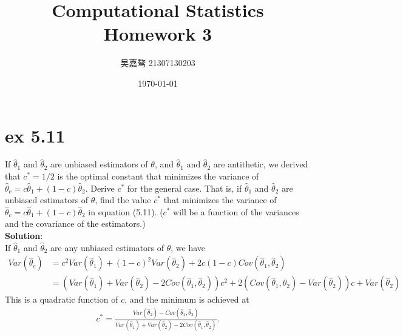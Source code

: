 \documentclass[UTF8]{ctexart}
\title{\textbf{Computational Statistics Homework 3}}
\author{吴嘉骜 21307130203}
\date{\today}
\begin{document}
\maketitle

\noindent
\section{ex 5.11}
\setlength{\parindent}{0pt}
If $\hat{\theta}_1$ and $\hat{\theta}_2$ are unbiased estimators of $\theta$, 
and $\hat{\theta}_1$ and $\hat{\theta}_2$ are antithetic, we derived that $c^* = 1/2$ 
is the optimal constant that minimizes the variance of $\hat{\theta}_c = c\hat{\theta}_1 + (1-c)\hat{\theta}_2$.
Derive $c^*$ for the general case. That is, if $\hat{\theta}_1$ and $\hat{\theta}_2$ are unbiased estimators of $\theta$, 
find the value $c^*$ that minimizes the variance of $\hat{\theta}_c = c\hat{\theta}_1 + (1-c)\hat{\theta}_2$
in equation (5.11). ($c^*$ will be a function of the variances and the covariance of the estimators.)\\
\textbf{Solution}:\\
If $\hat{\theta}_1$ and $\hat{\theta}_2$ are any unbiased estimators of $\theta$, we have
\begin{align*}
    Var(\hat{\theta}_c) &= c^2Var(\hat{\theta}_1) + (1-c)^2Var(\hat{\theta}_2) + 2c(1-c)Cov(\hat{\theta}_1, \hat{\theta}_2)\\
    &= (Var(\hat{\theta}_1) + Var(\hat{\theta}_2) - 2Cov(\hat{\theta}_1, \hat{\theta}_2))c^2 + 2(Cov(\hat{\theta}_1, \hat{\theta}_2) - Var(\hat{\theta}_2))c + Var(\hat{\theta}_2)
\end{align*}
This is a quadratic function of $c$, and the minimum is achieved at
\begin{align*}
    c^* = \frac{Var(\hat{\theta}_2) - Cov(\hat{\theta}_1, \hat{\theta}_2)}{Var(\hat{\theta}_1) + Var(\hat{\theta}_2) - 2Cov(\hat{\theta}_1, \hat{\theta}_2)}.
\end{align*}
\end{document}
